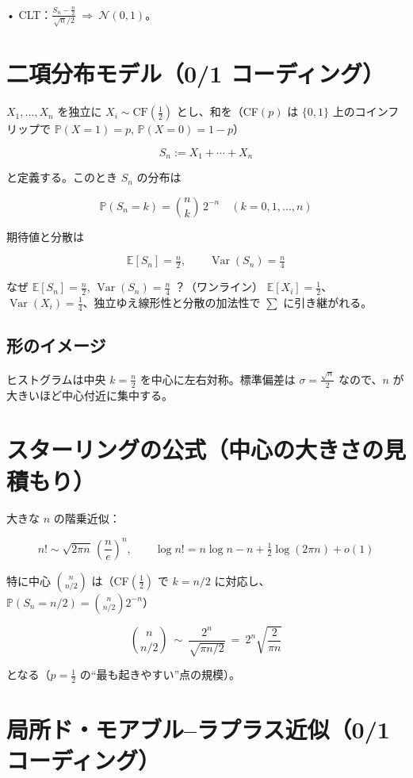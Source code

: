 \documentclass[uplatex,dvipdfmx,11pt,a4paper,openany]{bxjsbook}
\begin{document}
• CLT：$\displaystyle \frac{S_n-\tfrac{n}{2}}{\sqrt{n}/2}\ \Rightarrow\ \mathcal N(0,1)$。

\section{二項分布モデル（0/1 コーディング）}
$X_1,\dots,X_n$ を独立に $X_i\sim \mathrm{CF}(\tfrac12)$ とし、和を（CF$(p)$ は $\{0,1\}$ 上のコインフリップで $\mathbb P(X=1)=p$, $\mathbb P(X=0)=1-p$）

\[S_n:=X_1+\cdots+X_n\]

と定義する。このとき $S_n$ の分布は

\[\mathbb P(S_n=k)=\binom{n}{k}\,2^{-n}\quad (k=0,1,\dots,n)\]

期待値と分散は

\[\mathbb E[S_n]=\tfrac{n}{2},\qquad \operatorname{Var}(S_n)=\tfrac{n}{4}\]

\begin{detailblock}{なぜ $\mathbb E[S_n]=\tfrac{n}{2}$, $\operatorname{Var}(S_n)=\tfrac{n}{4}$ ？（ワンライン）}
$\mathbb E[X_i]=\tfrac12$、$\operatorname{Var}(X_i)=\tfrac14$、独立ゆえ線形性と分散の加法性で $\sum$ に引き継がれる。

\end{detailblock}

\subsection{形のイメージ}
ヒストグラムは中央 $k=\tfrac{n}{2}$ を中心に左右対称。標準偏差は $\sigma=\tfrac{\sqrt n}{2}$ なので、$n$ が大きいほど中心付近に集中する。

\section{スターリングの公式（中心の大きさの見積もり）}
大きな $n$ の階乗近似：

\[n!\sim \sqrt{2\pi n}\,\left(\frac{n}{e}\right)^n,\qquad
            \log n!=n\log n-n+\tfrac12\log(2\pi n)+o(1)\]

特に中心 $\binom{n}{n/2}$ は（CF$(\tfrac12)$ で $k=n/2$ に対応し、$\mathbb P(S_n=n/2)=\binom{n}{n/2}2^{-n}$）

\[\binom{n}{n/2}\ \sim\ \frac{2^n}{\sqrt{\pi n/2}}\ =\ 2^n\sqrt{\frac{2}{\pi n}}\]

となる（$p=\tfrac12$ の“最も起きやすい”点の規模）。

\section{局所ド・モアブル–ラプラス近似（0/1 コーディング）}
\end{document}
